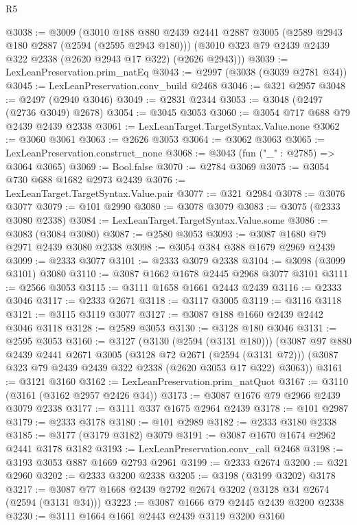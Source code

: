 \begin{lexlean}{R5}
\begin{coremodule}
@3038 := @3009
    (@3010
      @188
      @880
      @2439
      @2441
      @2887
      @3005
      (@2589 @2943 @180 @2887 (@2594 (@2595 @2943 @180)))
      (@3010 @323 @79 @2439 @2439 @322 @2338 (@2620 @2943 @17 @322) (@2626 @2943)))
@3039 := LexLeanPreservation.prim_natEq
@3043 := @2997 (@3038 (@3039 @2781 @34))
@3045 := LexLeanPreservation.conv_build @2468
@3046 := @321 @2957
@3048 := @2497 (@2940 @3046)
@3049 := @2831 @2344
@3053 := @3048 (@2497 (@2736 @3049) @2678)
@3054 := @3045 @3053
@3060 := @3054 @717 @688 @79 @2439 @2439 @2338
@3061 := LexLeanTarget.TargetSyntax.Value.none
@3062 := @3060 @3061
@3063 := @2626 @3053
@3064 := @3062 @3063
@3065 := LexLeanPreservation.construct_none
@3068 := @3043 (fun ("_" : @2785) => @3064 @3065)
@3069 := Bool.false
@3070 := @2784 @3069
@3075 := @3054 @730 @688 @1682 @2973 @2439
@3076 := LexLeanTarget.TargetSyntax.Value.pair
@3077 := @321 @2984
@3078 := @3076 @3077
@3079 := @101 @2990
@3080 := @3078 @3079
@3083 := @3075 (@2333 @3080 @2338)
@3084 := LexLeanTarget.TargetSyntax.Value.some
@3086 := @3083 (@3084 @3080)
@3087 := @2580 @3053
@3093 := @3087 @1680 @79 @2971 @2439 @3080 @2338
@3098 := @3054 @384 @388 @1679 @2969 @2439
@3099 := @2333 @3077
@3101 := @2333 @3079 @2338
@3104 := @3098 (@3099 @3101) @3080
@3110 := @3087 @1662 @1678 @2445 @2968 @3077 @3101
@3111 := @2566 @3053
@3115 := @3111 @1658 @1661 @2443 @2439
@3116 := @2333 @3046
@3117 := @2333 @2671
@3118 := @3117 @3005
@3119 := @3116 @3118
@3121 := @3115 @3119 @3077
@3127 := @3087 @188 @1660 @2439 @2442 @3046 @3118
@3128 := @2589 @3053
@3130 := @3128 @180 @3046
@3131 := @2595 @3053
@3160 := @3127
    (@3130 (@2594 (@3131 @180)))
    (@3087
      @97
      @880
      @2439
      @2441
      @2671
      @3005
      (@3128 @72 @2671 (@2594 (@3131 @72)))
      (@3087 @323 @79 @2439 @2439 @322 @2338 (@2620 @3053 @17 @322) @3063))
@3161 := @3121 @3160
@3162 := LexLeanPreservation.prim_natQuot
@3167 := @3110 (@3161 (@3162 @2957 @2426 @34))
@3173 := @3087 @1676 @79 @2966 @2439 @3079 @2338
@3177 := @3111 @337 @1675 @2964 @2439
@3178 := @101 @2987
@3179 := @2333 @3178
@3180 := @101 @2989
@3182 := @2333 @3180 @2338
@3185 := @3177 (@3179 @3182) @3079
@3191 := @3087 @1670 @1674 @2962 @2441 @3178 @3182
@3193 := LexLeanPreservation.conv_call @2468
@3198 := @3193 @3053 @887 @1669 @2793 @2961
@3199 := @2333 @2674
@3200 := @321 @2960
@3202 := @2333 @3200 @2338
@3205 := @3198 (@3199 @3202) @3178
@3217 := @3087 @77 @1668 @2439 @2792 @2674 @3202 (@3128 @34 @2674 (@2594 (@3131 @34)))
@3223 := @3087 @1666 @79 @2445 @2439 @3200 @2338
@3230 := @3111 @1664 @1661 @2443 @2439 @3119 @3200 @3160

\end{coremodule}
\end{lexlean}
